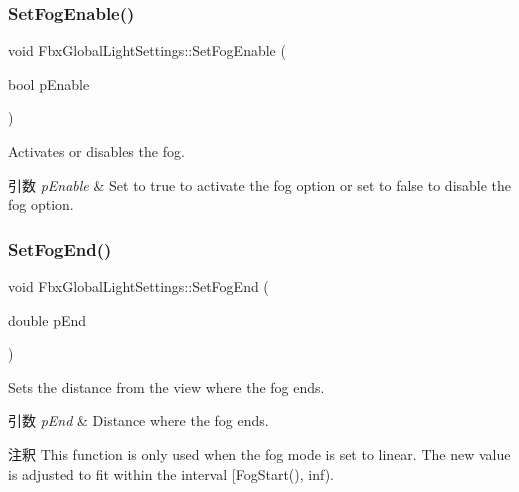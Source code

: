 \subsubsection{\texorpdfstring{Set\+Fog\+Enable()}{SetFogEnable()}}
{\footnotesize\ttfamily void Fbx\+Global\+Light\+Settings\+::\+Set\+Fog\+Enable (\begin{DoxyParamCaption}\item[{bool}]{p\+Enable }\end{DoxyParamCaption})}

Activates or disables the fog. 
\begin{DoxyParams}{引数}
{\em p\+Enable} & Set to {\ttfamily true} to activate the fog option or set to {\ttfamily false} to disable the fog option. \\
\hline
\end{DoxyParams}
\mbox{\label{class_fbx_global_light_settings_a3408c6c5b1cf643ebe81cd4daaac82dc}} 
\subsubsection{\texorpdfstring{Set\+Fog\+End()}{SetFogEnd()}}
{\footnotesize\ttfamily void Fbx\+Global\+Light\+Settings\+::\+Set\+Fog\+End (\begin{DoxyParamCaption}\item[{double}]{p\+End }\end{DoxyParamCaption})}

Sets the distance from the view where the fog ends. 
\begin{DoxyParams}{引数}
{\em p\+End} & Distance where the fog ends. \\
\hline
\end{DoxyParams}
\begin{DoxyRemark}{注釈}
This function is only used when the fog mode is set to linear. The new value is adjusted to fit within the interval \mbox{[}Fog\+Start(), inf). 
\end{DoxyRemark}
\mbox{\label{class_fbx_global_light_settings_a61010aa498fa159fa6fa91cf77d78501}} 
